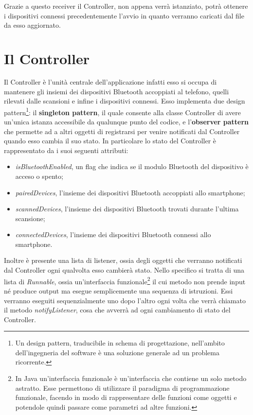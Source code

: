 Grazie a questo receiver il Controller, non appena verrà istanziato, potrà ottenere i dispositivi connessi precedentemente l'avvio in quanto verranno caricati dal file da esso aggiornato.

\section{Il Controller} \label{ref:controller}
Il Controller è l'unità centrale dell'applicazione infatti esso si occupa di mantenere gli insiemi dei dispositivi Bluetooth accoppiati al telefono, quelli rilevati dalle scansioni e infine i dispositivi connessi. Esso implementa due design pattern\footnote{Un design pattern, traducibile in schema di progettazione, nell'ambito dell'ingegneria del software è una soluzione generale ad un problema ricorrente.}: il \textbf{singleton pattern}, il quale consente alla classe Controller di avere un'unica istanza accessibile da qualunque punto del codice, e l'\textbf{observer pattern} che permette ad a altri oggetti di registrarsi per venire notificati dal Controller quando esso cambia il suo stato. In particolare lo stato del Controller è rappresentato da i suoi seguenti attributi:
\begin{itemize}
    \item \textit{isBluetoothEnabled}, un flag che indica se il modulo Bluetooth del dispositivo è acceso o spento;
    \item \textit{pairedDevices}, l'insieme dei dispositivi Bluetooth accoppiati allo smartphone;
    \item \textit{scannedDevices}, l'insieme dei dispositivi Bluetooth trovati durante l'ultima scansione;
    \item \textit{connectedDevices}, l'insieme dei dispositivi Bluetooth connessi allo smartphone.
\end{itemize}

Inoltre è presente una lista di listener, ossia degli oggetti che verranno notificati dal Controller ogni qualvolta esso cambierà stato. Nello specifico si tratta di una lista di \textit{Runnable}, ossia un'interfaccia funzionale\footnote{In Java un'interfaccia funzionale è un'interfaccia che contiene un solo metodo astratto. Esse permettono di utilizzare il paradigma di programmazione funzionale, facendo in modo di rappresentare delle funzioni come oggetti e potendole quindi passare come parametri ad altre funzioni.} il cui metodo non prende input né produce output ma esegue semplicemente una sequenza di istruzioni. Essi verranno eseguiti sequenzialmente uno dopo l'altro ogni volta che verrà chiamato il metodo \textit{notifyListener}, cosa che avverrà ad ogni cambiamento di stato del Controller.

